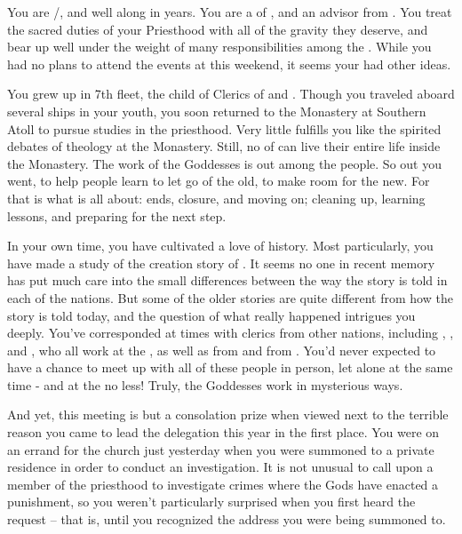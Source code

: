 \documentclass[char]{GL2020}
\begin{document}
\name{\cEbbPriest{}}

You are \cEbbPriest{\full} {\cEbbPriest{\they}/\cEbbPriest{\them}}, and well along in years. You are a \cEbbPriest{\cleric} of \cEbb{\full}, and an advisor from \pShip{}. You treat the sacred duties of your Priesthood with all of the gravity they deserve, and bear up well under the weight of many responsibilities among the \pShippies{}. While you had no plans to attend the events at \pSchool{} this weekend, it seems your \cEbb{\God} had other ideas.

You grew up in 7th fleet, the child of Clerics of \cEbb{} and \cFlow{}. Though you traveled aboard several ships in your youth, you soon returned to the Monastery at Southern Atoll to pursue studies in the priesthood. Very little fulfills you like the spirited debates of theology at the Monastery. Still, no \cEbbPriest{\cleric} of \cEbb{} can live their entire life inside the Monastery. The work of the Goddesses is out among the people. So out you went, to help people learn to let go of the old, to make room for the new. For that is what \cEbb{} is all about: ends, closure, and moving on; cleaning up, learning lessons, and preparing for the next step.

In your own time, you have cultivated a love of history. Most particularly, you have made a study of the creation story of \pEarth{}. It seems no one in recent memory has put much care into the small differences between the way the story is told in each of the nations. But some of the older stories are quite different from how the story is told today, and the question of what really happened intrigues you deeply. You’ve corresponded at times with clerics from other nations, including \cBeetle{}, \cFlowPriest{}, and \cInterpol{}, who all work at the \pSchool{}, as well as \cAntiChup{} from \pTech{} and \cHedonist{} from \pFarm{}. You’d never expected to have a chance to meet up with all of these people in person, let alone at the same time - and at the \pSchool{} no less! Truly, the Goddesses work in mysterious ways.

And yet, this meeting is but a consolation prize when viewed next to the terrible reason you came to lead the \pShip{} delegation this year in the first place. You were on an errand for the church just yesterday when you were summoned to a private residence in order to conduct an investigation. It is not unusual to call upon a member of the priesthood to investigate crimes where the Gods have enacted a punishment, so you weren’t particularly surprised when you first heard the request -- that is, until you recognized the address you were being summoned to.
\end{document}

